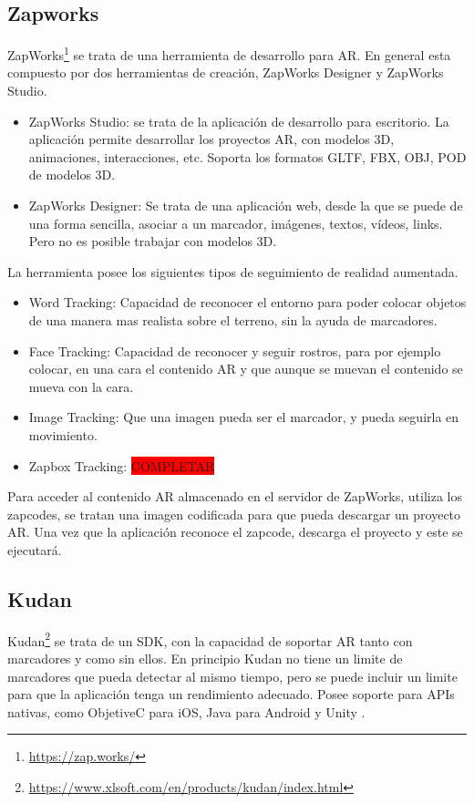 \subsection{Zapworks} ZapWorks\footnote{\url{https://zap.works/}} se trata de una herramienta de desarrollo para AR. En general esta compuesto por dos herramientas de creación, ZapWorks Designer y ZapWorks Studio.
\begin{itemize}
	\item ZapWorks Studio: se trata de la aplicación de desarrollo para escritorio. La aplicación permite desarrollar los proyectos AR, con modelos 3D, animaciones, interacciones, etc. Soporta los formatos  GLTF, FBX, OBJ, POD de modelos 3D.
	\item ZapWorks Designer: Se trata de una aplicación web, desde la que se puede de una forma sencilla, asociar a un marcador, imágenes, textos, vídeos, links. Pero no es posible trabajar con modelos 3D.
\end{itemize}	
La herramienta posee los siguientes tipos de seguimiento de realidad aumentada.
\begin{itemize}
	\item Word Tracking: Capacidad de reconocer el entorno para poder colocar objetos de una manera mas realista sobre el terreno, sin la ayuda de marcadores.
	\item Face Tracking: Capacidad de reconocer y seguir rostros, para por ejemplo colocar, en una cara el contenido AR y que aunque se muevan el contenido se mueva con la cara.
	\item Image Tracking: Que una imagen pueda ser el marcador, y pueda seguirla en movimiento.
	\item Zapbox Tracking: \colorbox{red}{COMPLETAR}
	 
\end{itemize}
Para acceder al contenido AR almacenado en el servidor de ZapWorks, utiliza los zapcodes, se tratan una imagen codificada para que pueda descargar un proyecto AR. Una vez que la aplicación reconoce el zapcode, descarga el proyecto y este se ejecutará.


\subsection{Kudan} Kudan\footnote{\url{https://www.xlsoft.com/en/products/kudan/index.html}} 
se trata de un SDK, con la capacidad de soportar AR tanto con marcadores y como sin ellos. En principio Kudan no tiene un limite de marcadores que pueda detectar al mismo tiempo, pero se puede incluir un limite para que la aplicación tenga un rendimiento adecuado. 
Posee soporte para APIs nativas, como ObjetiveC para iOS, Java para Android y Unity \cite{kudan_developer_hub}.


